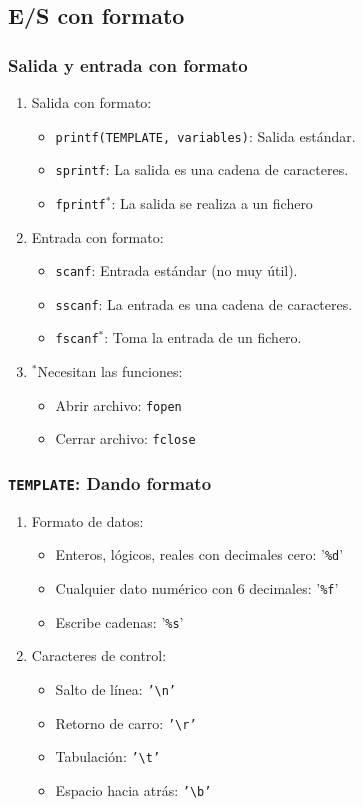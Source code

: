 \subsection{E/S con formato}
\begin{frame}[label=salida_std]
 \frametitle{Salida y entrada con formato}
 \begin{enumerate}
    \item Salida con formato:
  \begin{itemize}
    \item \alert{\texttt{printf(TEMPLATE, variables)}}: Salida estándar.
    \item \alert{\texttt{sprintf}}: La salida es una cadena de caracteres.
    \item \alert{\texttt{fprintf}$^*$}: La salida se realiza a un fichero
  \end{itemize}
  \item Entrada con formato:
  \begin{itemize}
    \item \alert{\texttt{scanf}}: Entrada estándar (no muy útil).
    \item \alert{\texttt{sscanf}}: La entrada es una cadena de caracteres.
    \item \alert{\texttt{fscanf}$^*$}: Toma la entrada de un fichero.
  \end{itemize}
  \item \alert{$^{*}$}Necesitan las funciones:
  \begin{itemize}
    \item Abrir archivo: \alert{\texttt{fopen}}
    \item Cerrar archivo: \alert{\texttt{fclose}}
  \end{itemize}
 \end{enumerate}
\end{frame}
\begin{frame}[label=template]
 \frametitle{\texttt{TEMPLATE}: Dando formato}
 \begin{enumerate}
  \item Formato de datos:
  \begin{itemize}
    \item Enteros, lógicos, reales con decimales cero: \alert{'\texttt{\%d}'}
    \item Cualquier dato numérico con 6 decimales: \alert{'\texttt{\%f}'}
    \item Escribe cadenas: \alert{'\texttt{\%s}'}
  \end{itemize}
  \item Caracteres de control:
  \begin{itemize}
    \item Salto de línea: \alert{\texttt{'\textbackslash n'}}
    \item Retorno de carro: \texttt{'\textbackslash r'}
    \item Tabulación: \alert{\texttt{'\textbackslash t'}}
    \item Espacio hacia atrás: \texttt{'\textbackslash b'}
  \end{itemize}
 \end{enumerate}
\end{frame}
